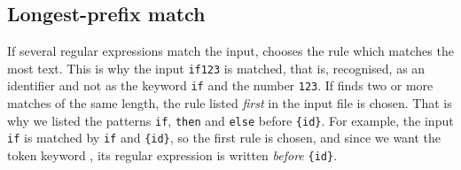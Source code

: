 \subsection*{Longest-prefix match}

If several regular expressions match the input, \Lex chooses the rule
which matches the most text. This is why the input \verb+if123+ is
matched, that is, recognised, as an identifier and not as the keyword
\verb+if+ and the number \verb+123+. If \Lex finds two or more matches
of the same length, the rule listed \emph{first} in the \Lex input
file is chosen. That is why we listed the patterns \verb+if+,
\verb+then+ and \verb+else+ before \verb+{id}+. For example, the input
\verb+if+ is matched by \verb+if+ and \verb+{id}+, so the first rule
is chosen, and since we want the token keyword , its regular
expression is written \emph{before} \verb+{id}+.

